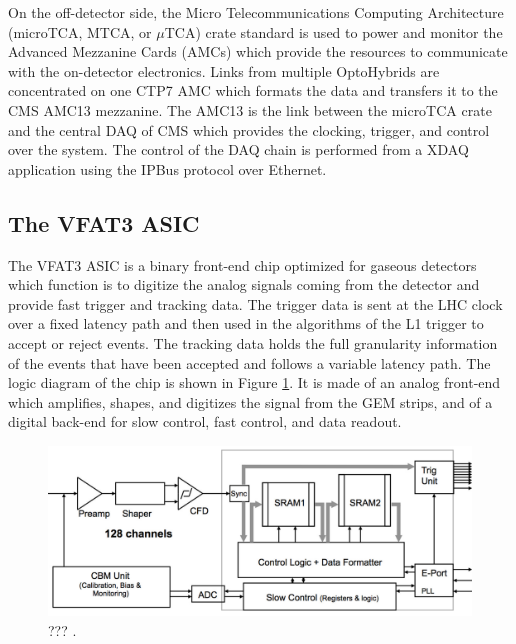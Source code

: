     On the off-detector side, the Micro Telecommunications Computing Architecture (microTCA, MTCA, or $\mu$TCA) \cite{PICMG} crate standard is used to power and monitor the Advanced Mezzanine Cards (AMCs) which provide the resources to communicate with the on-detector electronics. Links from multiple OptoHybrids are concentrated on one CTP7 AMC which formats the data and transfers it to the CMS AMC13 mezzanine. The AMC13 is the link between the microTCA crate and the central DAQ of CMS which provides the clocking, trigger, and control over the system. The control of the DAQ chain is performed from a XDAQ application using the IPBus protocol over Ethernet.

    \subsection{The VFAT3 ASIC}

      The VFAT3 ASIC is a binary front-end chip optimized for gaseous detectors which function is to digitize the analog signals coming from the detector and provide fast trigger and tracking data. The trigger data is sent at the LHC clock over a fixed latency path and then used in the algorithms of the L1 trigger to accept or reject events. The tracking data holds the full granularity information of the events that have been accepted and follows a variable latency path. The logic diagram of the chip is shown in Figure \ref{fig:II-2-vfat3}. It is made of an analog front-end which amplifies, shapes, and digitizes the signal from the GEM strips, and of a digital back-end for slow control, fast control, and data readout. \\

      \begin{figure}[h!]
        \centering
        \includegraphics[width=\textwidth]{img/II-2-daq/vfat3.pdf}
        \caption{??? \cite{Colaleo:2021453}.}
        \label{fig:II-2-vfat3}
      \end{figure}

